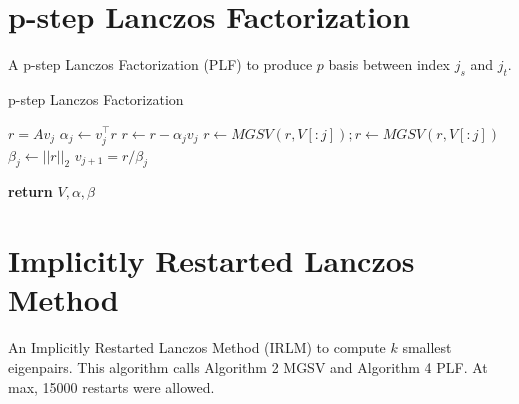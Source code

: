 \documentclass[a4paper]{article}
\begin{document}
\section{p-step Lanczos Factorization}
A p-step Lanczos Factorization (PLF) to produce $p$ basis between index $j_s$ and $j_t$. 

\begin{algorithm}
\caption{p-step Lanczos Factorization}\label{alg:PLF}
\begin{algorithmic}[1]


    \State $r = Av_j$
    \State $\alpha_j \gets v_j^\top r  $
    \State $r \gets r - \alpha_j v_j $
    \State $r \gets MGSV(r,V[:j]); r \gets MGSV(r,V[:j])$ 
    \State $\beta_j \gets ||r||_2  $
    \State $v_{j+1} = r / \beta_j$
\EndFor


\State \textbf{return} $V, \alpha, \beta$

\EndProcedure
\end{algorithmic}
\end{algorithm}



\pagebreak





\section{Implicitly Restarted Lanczos Method}
An Implicitly Restarted Lanczos Method (IRLM) to compute $k$ smallest eigenpairs. This algorithm calls Algorithm 2 MGSV and Algorithm 4 PLF. At max, 15000 restarts were allowed.
\end{document}
